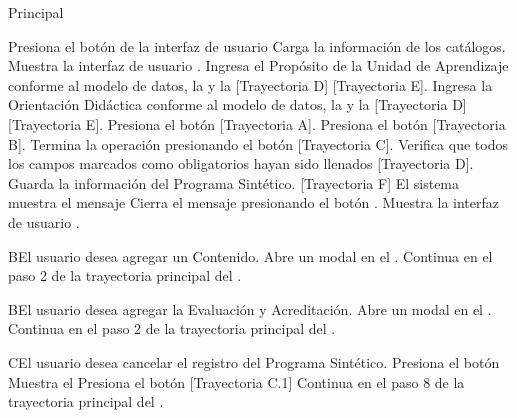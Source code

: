 \begin{UCtrayectoria}{Principal}

\UCpaso[\UCactor] Presiona el botón  de la interfaz de usuario 
\UCpaso Carga la información de los catálogos.
\UCpaso Muestra la interfaz de usuario .
\UCpaso[\UCactor] Ingresa el Propósito de la Unidad de Aprendizaje conforme al modelo de datos, la  y la  [Trayectoria D] [Trayectoria E]. 
\UCpaso[\UCactor] Ingresa la Orientación Didáctica conforme al modelo de datos, la  y la  [Trayectoria D] [Trayectoria E].
\UCpaso[\UCactor] Presiona el botón  [Trayectoria A].
\UCpaso[\UCactor] Presiona el botón  [Trayectoria B].
\UCpaso[\UCactor] Termina la operación presionando el botón  [Trayectoria C].
\UCpaso Verifica que todos los campos marcados como obligatorios hayan sido llenados [Trayectoria D].
\UCpaso Guarda la información del Programa Sintético. [Trayectoria F]
\UCpaso El sistema muestra el mensaje 
\UCpaso[\UCactor] Cierra el mensaje presionando el botón . 
\UCpaso Muestra la interfaz de usuario .
\end{UCtrayectoria}


\begin{UCtrayectoriaA}{B}{El usuario desea agregar un Contenido.}
\UCpaso Abre un modal en el .
\UCpaso Continua en el paso 2 de la trayectoria principal del .
\end{UCtrayectoriaA}

\begin{UCtrayectoriaA}{B}{El usuario desea agregar la Evaluación y Acreditación.}
\UCpaso Abre un modal en el .
\UCpaso Continua en el paso 2 de la trayectoria principal del .
\end{UCtrayectoriaA}

\begin{UCtrayectoriaA}{C}{El usuario desea cancelar el registro del Programa Sintético.}
\UCpaso[\UCactor] Presiona el botón 
\UCpaso Muestra el 
\UCpaso[\UCactor] Presiona el botón  [Trayectoria C.1]
\UCpaso Continua en el paso 8 de la trayectoria principal del .
\end{UCtrayectoriaA}

